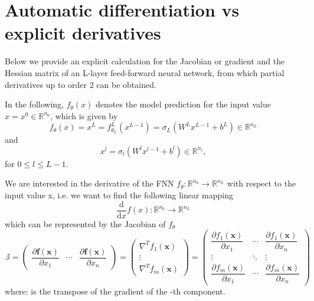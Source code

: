 \section{Automatic differentiation vs explicit derivatives}
\label{ch3:sec3}

Below we provide an explicit calculation for the Jacobian or gradient and the Hessian matrix of an L-layer feed-forward neural network, from which partial derivatives up to order 2 can be obtained. 

In the following, $f_{\theta}(x)$ denotes the model prediction for the input value $x = x^0 \in \mathbb{R}^{n_0}$, which is given by 
\begin{equation}
    \label{model prediction}
    f_{\theta}(x) = x^{L} = f^{L}_{\theta_L}(x^{L-1}) = \sigma_{L} (W^{L} x^{L-1} + b^{L}) \in \mathbb{R}^{n_L} 
\end{equation}
and 
\begin{equation*}
    x^{l} = \sigma_{l} (W^{l} x^{l-1} + b^{l}) \in \mathbb{R}^{n_l}, 
\end{equation*}
for $0 \leq l \leq L-1$.

We are interested in the derivative of the FNN $f_{\theta} \colon \mathbb{R}^{n_0} \to \mathbb{R}^{n_L}$ with respect to the input value x, i.e. we want to find the following linear mapping
\begin{equation*}
    \frac{\mathrm{d}}{\mathrm{d} x} f(x) \colon \mathbb{R}^{n_0} \to \mathbb{R}^{n_L}
\end{equation*}
which can be represented by the Jacobian of $f_{\theta}$
\begin{equation*}
    \mathbb{J}= \begin{pmatrix} \dfrac{\partial \mathbf{f}(\mathbf{x})}{\partial x_{1}} & \cdots & \dfrac{\partial \mathbf{f}(\mathbf{x})}{\partial x_{n}} \end{pmatrix} = \begin{pmatrix} \nabla^{T} f_{1}(\mathbf{x}) \\ \vdots \\ \nabla^{T} f_{m}(\mathbf{x})\end{pmatrix} = \begin{pmatrix} \dfrac{\partial f_{1}(\mathbf{x})}{\partial x_{1}} & \cdots & \dfrac{\partial f_{1}(\mathbf{x})}{\partial x_{n}} \\ \vdots & \ddots & \vdots \\ \dfrac{\partial f_{m}(\mathbf{x})}{\partial x_{1}} & \cdots & \dfrac{\partial f_{m}(\mathbf{x})}{\partial x_{n}} \end{pmatrix} 
\end{equation*}
where:  is the transpose of the gradient of the -th component.



